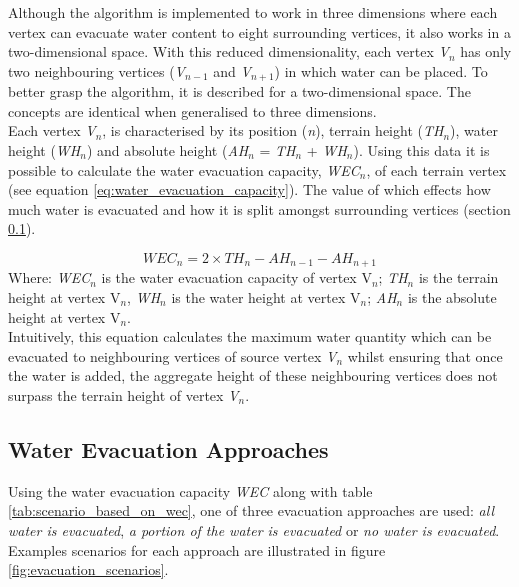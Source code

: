 Although the algorithm is implemented to work in three dimensions where each vertex can evacuate water content to eight surrounding vertices, it also works in a two-dimensional space. With this reduced dimensionality, each vertex \textit{V$_{n}$} has only two neighbouring vertices (\textit{V$_{n-1}$} and \textit{V$_{n+1}$}) in which water can be placed. To better grasp the algorithm, it is described for a two-dimensional space. The concepts are identical when generalised to three dimensions.  \\

Each vertex \textit{V$_{n}$}, is characterised by its position (\textit{n}), terrain height (\textit{TH$_{n}$}), water height (\textit{WH$_{n}$}) and absolute height (\textit{AH$_{n}$} = \textit{TH$_{n}$} + \textit{WH$_{n}$}). Using this data it is possible to calculate the water evacuation capacity, \textit{WEC$_{n}$}, of each terrain vertex (see equation \ref{eq:water_evacuation_capacity}). The value of which effects how much water is evacuated and how it is split amongst surrounding vertices (section \ref{subsec:evacuation_approaches}).

\begin{equation} \label{eq:water_evacuation_capacity}
	WEC_{n} = 2 \times TH_{n} - AH_{n-1} - AH_{n+1}
\end{equation}
Where: \textit{WEC$_{n}$} is the water evacuation capacity of vertex V$_{n}$; \textit{TH$_{n}$} is the terrain height at vertex V$_{n}$, \textit{WH$_{n}$} is the water height at vertex V$_{n}$; \textit{AH$_{n}$} is the absolute height at vertex V$_{n}$.\\

Intuitively, this equation calculates the maximum water quantity which can be evacuated to neighbouring vertices of source vertex \textit{V$_{n}$} whilst ensuring that once the water is added, the aggregate height of these neighbouring vertices does not surpass the terrain height of vertex \textit{V$_{n}$}.\\

\subsection{Water Evacuation Approaches} \label{subsec:evacuation_approaches}

Using the water evacuation capacity \textit{WEC} along with table \ref{tab:scenario_based_on_wec}, one of three evacuation approaches are used:  \textit{all water is evacuated}, \textit{a portion of the water is evacuated} or \textit{no water is evacuated}. Examples scenarios for each approach are illustrated in figure \ref{fig:evacuation_scenarios}. \\

